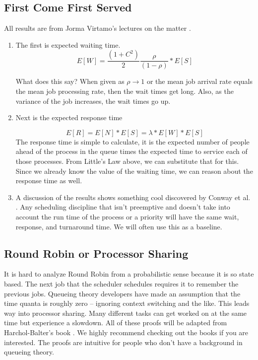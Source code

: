 \subsection{First Come First Served}

All results are from Jorma Virtamo's lectures on the matter \cite{virtamo}.

\begin{enumerate}
\item The first is expected waiting time.
  \[
  E[W] = \frac{(1 + C^2)}{2}\frac{\rho}{(1 - \rho)} * E[S]
  \]

  What does this say? When given as $\rho \rightarrow 1$ or the mean job arrival rate equals the mean job processing rate, then the wait times get long.
  Also, as the variance of the job increases, the wait times go up.

\item Next is the expected response time

  \[
  E[R] = E[N] * E[S] = \lambda * E[W] * E[S]
  \]
  The response time is simple to calculate, it is the expected number of people ahead of the process in the queue times the expected time to service each of those processes.
  From Little's Law above, we can substitute that for this. Since we already know the value of the waiting time, we can reason about the response time as well.
\item A discussion of the results shows something cool discovered by Conway et al. \cite{conway1967theory}.
  Any scheduling discipline that isn't preemptive and doesn't take into account the run time of the process or a priority will have the same wait, response, and turnaround time.
  We will often use this as a baseline.
\end{enumerate}

\subsection{Round Robin or Processor Sharing}

It is hard to analyze Round Robin from a probabilistic sense because it is so state based.
The next job that the scheduler schedules requires it to remember the previous jobs.
Queueing theory developers have made an assumption that the time quanta is roughly zero -- ignoring context switching and the like.
This leads way into processor sharing.
Many different tasks can get worked on at the same time but experience a slowdown.
All of these proofs will be adapted from Harchol-Balter's book \cite{harchol2013performance}.
We highly recommend checking out the books if you are interested.
The proofs are intuitive for people who don't have a background in queueing theory.

